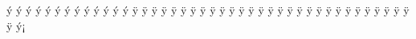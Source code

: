 ^^fd^^8a{\Armpe}%
^^fd^^8b{\Armje}%
^^fd^^8c{\Armra}%
^^fd^^8d{\Armse}%
^^fd^^8e{\Armvev}%
^^fd^^8f{\Armtyun}%
^^fd^^90{\Armre}%
^^fd^^91{\Armtso}%
^^fd^^92{\Armvyun}%
^^fd^^93{\Armpyur}%
^^fd^^94{\Armke}%
^^fd^^95{\Armo}%
^^fd^^96{\Armfe}%
%
^^ff^^80{\armho}%
^^ff^^81{\armdza}%
^^ff^^82{\armghat}%
^^ff^^83{\armtche}%
^^ff^^84{\armmen}%
^^ff^^85{\armhi}%
^^ff^^86{\armnu}%
^^ff^^87{\armsha}%
^^ff^^88{\armvo}%
^^ff^^89{\armcha}%
^^ff^^8a{\armpe}%
^^ff^^8b{\armje}%
^^ff^^8c{\armra}%
^^ff^^8d{\armse}%
^^ff^^8e{\armvev}%
^^ff^^8f{\armtyun}%
^^ff^^90{\armre}%
^^ff^^91{\armtso}%
^^ff^^92{\armvyun}%
^^ff^^93{\armpyur}%
^^ff^^94{\armke}%
^^ff^^95{\armo}%
^^ff^^96{\armfe}%
%
^^ff^^9d{\armsep}%
^^ff^^9c{\armexclam}%
^^ff^^9b{\armaccent}%
^^ff^^9e{\armquestion}%
^^ff^^9a{\armapostrophe}%
^^ff^^9f{\armabbrev}%
^^ff^^99{\armnum}%
%
%
^^fd^^a1{\Armayb}%
